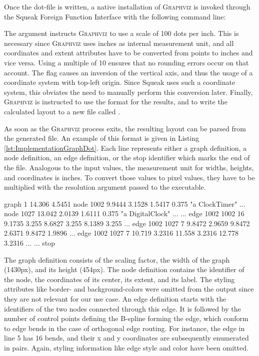 Once the dot-file is written, a native installation of \textsc{Graphviz} is invoked through the Squeak Foreign Function Interface with the following command line:
\begin{center}
\end{center}
The  argument instructs \textsc{Graphviz} to use a scale of 100 dots per inch.
This is necessary since \textsc{Graphviz} uses inches as internal measurement unit, and all coordinates and extent attributes have to be converted from points to inches and vice versa.
Using a multiple of 10 ensures that no rounding errors occur on that account.
The  flag causes an inversion of the vertical axis, and thus the usage of a coordinate system with top-left origin.
Since Squeak uses such a coordinate system, this obviates the need to manually perform this conversion later.
Finally, \textsc{Graphviz} is instructed to use the  format for the results, and to write the calculated layout to a new file called .

As soon as the \textsc{Graphviz} process exits, the resulting layout can be parsed from the generated file.
An example of this  format is given in Listing \ref{lst:ImplementationGraphDot}.
Each line represents either a graph definition, a node definition, an edge definition, or the stop identifier which marks the end of the file.
Analogous to the input values, the measurement unit for widths, heights, and coordinates is inches.
To convert those values to pixel values, they have to be multiplied with the resolution argument passed to the  executable.

\begin{graphviz}[caption={Output in \inlinecode{plain-ext} format as produced by \textsc{Graphviz} for the input from Listing \ref{lst:ImplementationGraphDot}.}, label=lst:ImplementationGraphPlainExt]
graph 1 14.306 4.5451
node 1002 9.9444 3.1528 1.5417 0.375 "a ClockTimer" ...
node 1027 13.042 2.0139 1.6111 0.375 "a DigitalClock" ...
...
edge 1002 1002 16 9.1735 3.255 8.6827 3.255 8.1389 3.255 ...
edge 1002 1027 7 9.8472 2.9659 9.8472 2.6371 9.8472 1.9896 ...
edge 1002 1027 7 10.719 3.2316 11.558 3.2316 12.778 3.2316 ...
...
stop
\end{graphviz}

The graph definition consists of the scaling factor, the width of the graph (1430px), and its height (454px).
The node definition contains the identifier of the node, the coordinates of its center, its extent, and its label.
The styling attributes like border- and background-colors were omitted from the output since they are not relevant for our use case.
An edge definition starts with the identifiers of the two nodes connected through this edge.
It is followed by the number of control points defining the B-spline forming the edge, which conform to edge bends in the case of orthogonal edge routing.
For instance, the edge in line 5 has 16 bends, and their x and y coordinates are subsequently enumerated in pairs.
Again, styling information like edge style and color have been omitted.

